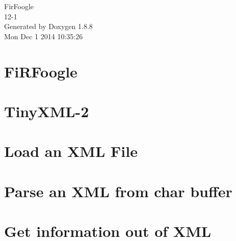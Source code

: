 \documentclass[twoside]{book}
\newcommand{\+}{\discretionary{\mbox{\scriptsize$\hookleftarrow$}}{}{}}
\newcommand{\clearemptydoublepage}{%
  \newpage{\pagestyle{empty}\cleardoublepage}%
}
\begin{document}
\hypersetup{pageanchor=false,
             bookmarks=true,
             bookmarksnumbered=true,
             pdfencoding=unicode
            }
\begin{titlepage}
\vspace*{7cm}
\begin{center}%
{\Large Fir\+Foogle \\[1ex]\large 12-\/1 }\\
\vspace*{1cm}
{\large Generated by Doxygen 1.8.8}\\
\vspace*{0.5cm}
{\small Mon Dec 1 2014 10:35:26}\\
\end{center}
\end{titlepage}
\clearemptydoublepage
\tableofcontents
\clearemptydoublepage
{}
\hypersetup{pageanchor=true}

\chapter{Fi\+R\+Foogle}
\label{md___users_courtneykent__fir_foogle__r_e_a_d_m_e}
\hypertarget{md___users_courtneykent__fir_foogle__r_e_a_d_m_e}{}

\chapter{Tiny\+X\+M\+L-\/2}
\label{md___users_courtneykent__fir_foogle__x_m_l_parsers_tinyxml2-master_readme}
\hypertarget{md___users_courtneykent__fir_foogle__x_m_l_parsers_tinyxml2-master_readme}{}

\chapter{Load an X\+M\+L File}
\label{_example-1}
\hypertarget{_example-1}{}

\chapter{Parse an X\+M\+L from char buffer}
\label{_example-2}
\hypertarget{_example-2}{}

\chapter{Get information out of X\+M\+L}
\label{_example-3}
\hypertarget{_example-3}{}

\end{document}
